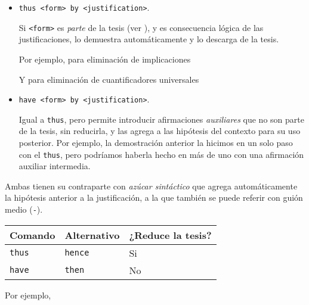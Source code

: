 \begin{itemize}
    \item \lstinline{thus <form> by <justification>}.
    
    Si \lstinline{<form>} es \textit{parte} de la tesis (ver
    ), y es consecuencia lógica de las
    justificaciones, lo demuestra automáticamente y lo descarga de la tesis.

    Por ejemplo, para eliminación de implicaciones

    

    Y para eliminación de cuantificadores universales

    

    \item \lstinline{have <form> by <justification>}.
    
    Igual a \lstinline{thus}, pero permite introducir afirmaciones
    \textit{auxiliares} que no son parte de la tesis, sin reducirla, y las
    agrega a las hipótesis del contexto para su uso posterior. Por ejemplo, la demostración
    anterior la hicimos en un solo paso con el \lstinline{thus}, pero podríamos
    haberla hecho en más de uno con una afirmación auxiliar intermedia.

    
\end{itemize}

Ambas tienen su contraparte con \textit{azúcar sintáctico} que agrega
automáticamente la hipótesis anterior a la justificación, a la que también se
puede referir con guión medio (\lstinline{-}).

\begin{table}[H]
    \centering
\begin{tabular}{l|l|l}
Comando             & Alternativo             & ¿Reduce la tesis? \\
\hline
\lstinline|thus|    & \lstinline|hence|       & Si               \\
\lstinline|have|    & \lstinline|then|        & No              
\end{tabular}
\end{table}

Por ejemplo, 
\begin{multicols}{2}
    
    \vfill\null
    \columnbreak
    
\end{multicols}


